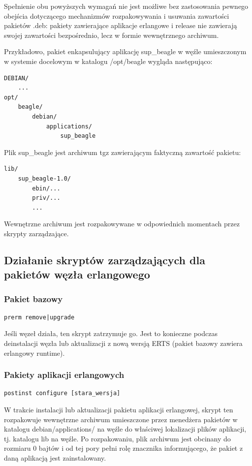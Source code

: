 \documentclass[polish,12pt]{aghthesis}
\begin{document}
Spełnienie obu powyższych wymagań nie jest możliwe bez zastosowania pewnego obejścia dotyczącego mechanizmów rozpakowywania i usuwania zawartości pakietów .deb: pakiety zawierające aplikacje erlangowe i release nie zawierają swojej zawartości bezpośrednio, lecz w formie wewnętrznego archiwum.

Przykładowo, pakiet enkapsulujący aplikację sup\_beagle w węźle umieszczonym w systemie docelowym w katalogu /opt/beagle wygląda następująco:

\begin{lstlisting}
DEBIAN/
    ...
opt/
    beagle/
        debian/
            applications/
                sup_beagle
\end{lstlisting}

Plik sup\_beagle jest archiwum tgz zawierającym faktyczną zawartość pakietu:

\begin{lstlisting}
lib/
    sup_beagle-1.0/
        ebin/...
        priv/...
        ...
\end{lstlisting}

Wewnętrzne archiwum jest rozpakowywane w odpowiednich momentach przez skrypty zarządzające.

\subsection{Działanie skryptów zarządzających dla pakietów węzła erlangowego}

\subsubsection{Pakiet bazowy}
\begin{lstlisting}
prerm remove|upgrade
\end{lstlisting}
Jeśli węzeł działa, ten skrypt zatrzymuje go. Jest to konieczne podczas deinstalacji węzła lub aktualizacji z nową wersją ERTS (pakiet bazowy zawiera erlangowy runtime).

\subsubsection{Pakiety aplikacji erlangowych}
\begin{lstlisting}
postinst configure [stara_wersja]
\end{lstlisting}

W trakcie instalacji lub aktualizacji pakietu aplikacji erlangowej, skrypt ten rozpakowuje wewnętrzne archiwum umieszczone przez menedżera pakietów w katalogu debian/applications/ na węźle do właściwej lokalizacji plików aplikacji, tj. katalogu lib na węźle. Po rozpakowaniu, plik archiwum jest obcinany do rozmiaru 0 bajtów i od tej pory pełni rolę znacznika informującego, że pakiet z daną aplikacją jest zainstalowany.
\end{document}
